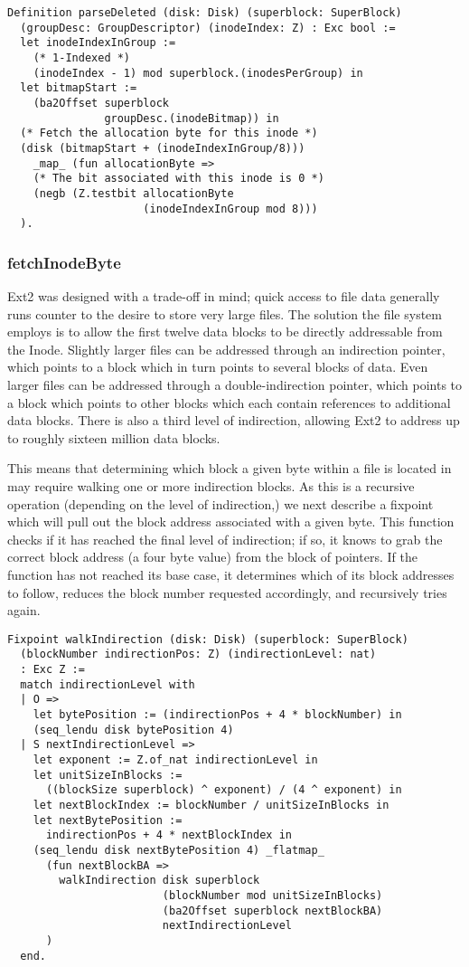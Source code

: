 \documentclass[nocopyrightspace]{sigplanconf}
\begin{document}
\begin{lstlisting}
Definition parseDeleted (disk: Disk) (superblock: SuperBlock)
  (groupDesc: GroupDescriptor) (inodeIndex: Z) : Exc bool :=
  let inodeIndexInGroup := 
    (* 1-Indexed *)
    (inodeIndex - 1) mod superblock.(inodesPerGroup) in
  let bitmapStart := 
    (ba2Offset superblock
               groupDesc.(inodeBitmap)) in
  (* Fetch the allocation byte for this inode *)
  (disk (bitmapStart + (inodeIndexInGroup/8))) 
    _map_ (fun allocationByte =>
    (* The bit associated with this inode is 0 *)
    (negb (Z.testbit allocationByte 
                     (inodeIndexInGroup mod 8)))
  ).
\end{lstlisting}

\subsubsection{fetchInodeByte}
Ext2 was designed with a trade-off in mind; quick access to file data
generally runs counter to the desire to store very large files. The solution
the file system employs is to allow the first twelve data blocks to be
directly addressable from the Inode. Slightly larger files can be addressed
through an indirection pointer, which points to a block which in turn points
to several blocks of data. Even larger files can be addressed through a
double-indirection pointer, which points to a block which points to other
blocks which each contain references to additional data blocks. There is also
a third level of indirection, allowing Ext2 to address up to roughly sixteen
million data blocks.

This means that determining which block a given byte within a file is located
in may require walking one or more indirection blocks. As this is a recursive
operation (depending on the level of indirection,) we next describe a fixpoint
which will pull out the block address associated with a given byte. This
function checks if it has reached the final level of indirection; if so, it
knows to grab the correct block address (a four byte value) from the block of
pointers. If the function has not reached its base case, it determines which
of its block addresses to follow, reduces the block number requested
accordingly, and recursively tries again.

\begin{lstlisting}
Fixpoint walkIndirection (disk: Disk) (superblock: SuperBlock)
  (blockNumber indirectionPos: Z) (indirectionLevel: nat) 
  : Exc Z :=
  match indirectionLevel with
  | O => 
    let bytePosition := (indirectionPos + 4 * blockNumber) in
    (seq_lendu disk bytePosition 4)
  | S nextIndirectionLevel =>
    let exponent := Z.of_nat indirectionLevel in
    let unitSizeInBlocks := 
      ((blockSize superblock) ^ exponent) / (4 ^ exponent) in
    let nextBlockIndex := blockNumber / unitSizeInBlocks in
    let nextBytePosition := 
      indirectionPos + 4 * nextBlockIndex in
    (seq_lendu disk nextBytePosition 4) _flatmap_ 
      (fun nextBlockBA =>
        walkIndirection disk superblock 
                        (blockNumber mod unitSizeInBlocks)
                        (ba2Offset superblock nextBlockBA)
                        nextIndirectionLevel
      )
  end.
\end{lstlisting}
\end{document}
